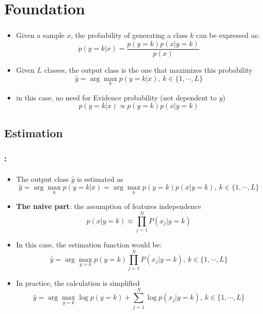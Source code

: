 \documentclass[xcolor=table]{beamer}
\begin{document}
\section{Foundation}

\begin{frame}
	\frametitle{\insertshortsubtitle}
	\framesubtitle{\insertsection}
	
	\begin{itemize}
		\item Given a sample $ x $, the probability of generating a class $ k $ can be expressed as:
		\[p(y=k|x) = \frac{p(y=k) p(x|y=k)}{p(x)}\]
		\item Given $ L $ classes, the output class is the one that maximizes this probability
		\[\hat{y} = \arg\max_{k} p(y=k|x),\ k \in \{1, \cdots, L\} \]
		\item in this case, no need for Evidence probability (not dependent to $ y $)
		\[p(y=k|x) \propto p(y=k) p(x|y=k)\]
	\end{itemize}
	
\end{frame}

\subsection{Estimation}

\begin{frame}
	\frametitle{\insertshortsubtitle: \insertsection}
	\framesubtitle{\insertsubsection}
	
	\begin{itemize}
		\item The output class $ \hat{y} $ is estimated as
		\[\hat{y} = \arg\max_{k} p(y=k|x) = \arg\max_{k} p(y=k) p(x|y=k),\ k \in \{1, \cdots, L\} \]
		
		\item \textbf{The naive part}: the assumption of features independence
		\[p(x|y=k) \approx \prod_{j=1}^{N} P(x_j|y=k)\]
		
		\item In this case, the estimation function would be:
		\[\hat{y} = \arg\max_{y=k} p(y=k) \prod_{j=1}^{N} P(x_j|y=k),\ k \in \{1, \cdots, L\}\]
		
		\item In practice, the calculation is simplified 
		\[\hat{y} = \arg\max_{y=k} \log p(y=k) + \sum_{j=1}^{N} \log p(x_j|y=k),\ k \in \{1, \cdots, L\}\]
	\end{itemize}
	
\end{frame}
\end{document}

